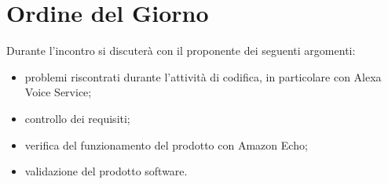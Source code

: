 \documentclass[../verbale-2017-05-10.tex]{subfiles}
\begin{document}
	
	\section{Ordine del Giorno}
		Durante l'incontro si discuterà con il proponente dei seguenti argomenti:
		\begin{itemize}
			\item problemi riscontrati durante l'attività di codifica, in particolare con Alexa Voice Service;
			\item controllo dei requisiti;
			\item verifica del funzionamento del prodotto con Amazon Echo;
			\item validazione del prodotto software.
		\end{itemize}
	
\end{document}
